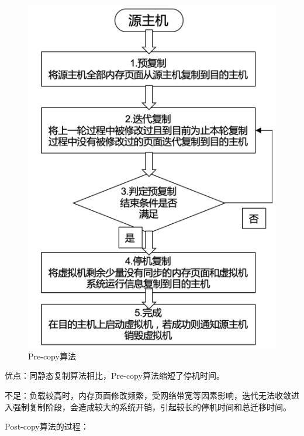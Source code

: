 \begin{figure}[htb]
  \centering
  \includegraphics{./Figure/IMG_Chap2_4.png}
  \caption{Pre-copy算法}\label{Fig:chap2_4}
\end{figure}

优点：同静态复制算法相比，Pre-copy算法缩短了停机时间。

不足：负载较高时，内存页面修改频繁，受网络带宽等因素影响，迭代无法收敛进入强制复制阶段，会造成较大的系统开销，引起较长的停机时间和总迁移时间。

Post-copy算法的过程：

